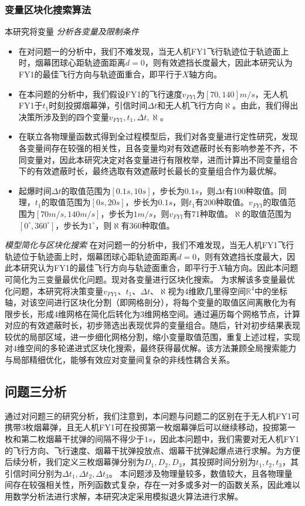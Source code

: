 \documentclass{article}
\begin{document}
\subsubsection{变量区块化搜索算法}
本研究将变量
\textit{分析各变量及限制条件}
\begin{itemize}
    \item 在对问题一的分析中，我们不难发现，当无人机FY1飞行轨迹位于轨迹面上时，烟幕团球心距轨迹面距离$d=0$，则有效遮挡长度最大，因此本研究认为FY1的最佳飞行方向与轨迹面重合，即平行于$X$轴方向。
    \item 在本问题的分析中，我们假设FY1的飞行速度$v_{FY1}$为$[70,140]m/s$，无人机FY1于$t_1$时刻投掷烟幕弹，引信时间$\Delta t$和无人机飞行方向$\aleph$。由此，我们得出决策所涉及到的四个变量$v_{FY1},t_1,\Delta t,\aleph$。
    \item 在联立各物理量函数式得到全过程模型后，我们对各变量进行定性研究，发现各变量间存在较强的相关性，且各变量均对有效遮蔽时长有影响参差不齐，不同变量对，因此本研究决定对各变量进行有限枚举，进而计算出不同变量组合下的有效遮蔽时长，最终选取有效遮蔽时长最长的变量组合作为最优解。
    \item 起爆时间$\Delta t$的取值范围为$[0.1s,10s]$，步长为$0.1s$，则$\Delta t$有100种取值。同理，$t_1$的取值范围为$[0s,20s]$，步长为$0.1s$，则$t_1$有200种取值。$v_{FY1}$的取值范围为$[70m/s,140m/s]$，步长为$1m/s$，则$v_{FY1}$有71种取值。$\aleph$的取值范围为$[0^\circ,360^\circ]$，步长为$1^\circ$，则$\aleph$有360种取值。
\end{itemize}

\textit{模型简化与区块化搜索}
在对问题一的分析中，我们不难发现，当无人机FY1飞行轨迹位于轨迹面上时，烟幕团球心距轨迹面距离$d=0$，则有效遮挡长度最大，因此本研究认为FY1的最佳飞行方向与轨迹面重合，即平行于$X$轴方向。因此本问题可简化为三变量最优化问题。现对各变量进行区块化搜索。
为求解该多变量最优化问题，本研究将决策变量$v_{FY1}$、$t_1$、$\Delta t$、$\aleph$视为4维欧几里得空间$\mathbb{R}^4$中的坐标轴，对该空间进行区块化分割（即网格剖分），将每个变量的取值区间离散化为有限步长，形成4维网格在简化后转化为3维网格空间。通过遍历每个网格节点，计算对应的有效遮蔽时长，初步筛选出表现优异的变量组合。随后，针对初步结果表现较优的局部区域，进一步细化网格分割，缩小变量取值范围，重复上述过程，实现对4维空间的多轮递进式区块化搜索，最终获得最优解。该方法兼顾全局搜索能力与局部精细优化，能够有效应对变量间复杂的非线性耦合关系。


\subsection{问题三分析}
通过对问题三的研究分析，我们注意到，本问题与问题二的区别在于无人机FY1可携带3枚烟幕弹，且无人机FY1可在投掷第一枚烟幕弹后可以继续移动，投掷第一枚和第二枚烟幕干扰弹的间隔不得少于$1s$，因此本问题中，我们需要对无人机FY1的飞行方向、飞行速度、烟幕干扰弹投放点、烟幕干扰弹起爆点进行求解。为方便后续分析，我们定义三枚烟幕弹分别为$D_1,D_2,D_3$，其投掷时间分别为$t_1,t_2,t_3$，其引信时间分别为$\Delta t_1,\Delta t_2,\Delta t_3$。
本问题涉及物理量较多，数值较大，且各物理量间存在较强相关性，所列函数式复杂，存在一对多或多对一的函数关系，因此难以用数学分析法进行求解，本研究决定采用模拟退火算法进行求解。
\end{document}
